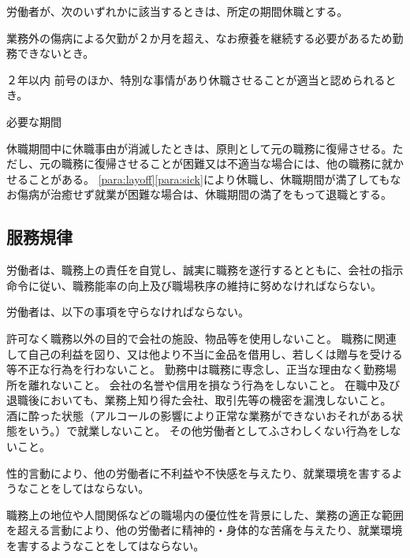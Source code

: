 \documentclass[10pt,a4paper]{jsarticle}
\begin{document}
労働者が、次のいずれかに該当するときは、所定の期間休職とする。
\label{para:layoff}
\begin{enumerate}
    \itm 業務外の傷病による欠勤が２か月を超え、なお療養を継続する必要があるため勤務できないとき。\par ２年以内
    \label{para:sick}
    \itm 前号のほか、特別な事情があり休職させることが適当と認められるとき。\par 必要な期間
\end{enumerate}
\term
休職期間中に休職事由が消滅したときは、原則として元の職務に復帰させる。ただし、元の職務に復帰させることが困難又は不適当な場合には、他の職務に就かせることがある。
\term
\ref{para:layoff}\ref{para:sick}により休職し、休職期間が満了してもなお傷病が治癒せず就業が困難な場合は、休職期間の満了をもって退職とする。

\subsection{服務規律}

労働者は、職務上の責任を自覚し、誠実に職務を遂行するとともに、会社の指示命令に従い、職務能率の向上及び職場秩序の維持に努めなければならない。

労働者は、以下の事項を守らなければならない。\label{para:obey}
\begin{enumerate}
    \itm	許可なく職務以外の目的で会社の施設、物品等を使用しないこと。
    \itm	職務に関連して自己の利益を図り、又は他より不当に金品を借用し、若しくは贈与を受ける等不正な行為を行わないこと。
    \itm	勤務中は職務に専念し、正当な理由なく勤務場所を離れないこと。
    \itm	会社の名誉や信用を損なう行為をしないこと。
    \itm	在職中及び退職後においても、業務上知り得た会社、取引先等の機密を漏洩しないこと。
    \itm	酒に酔った状態（アルコールの影響により正常な業務ができないおそれがある状態をいう。）で就業しないこと。
    \itm	その他労働者としてふさわしくない行為をしないこと。
\end{enumerate}

性的言動により、他の労働者に不利益や不快感を与えたり、就業環境を害するようなことをしてはならない。
\label{para:sexsualharrassment}

職務上の地位や人間関係などの職場内の優位性を背景にした、業務の適正な範囲を超える言動により、他の労働者に精神的・身体的な苦痛を与えたり、就業環境を害するようなことをしてはならない。
\label{para:powerharrassment}
\end{document}
